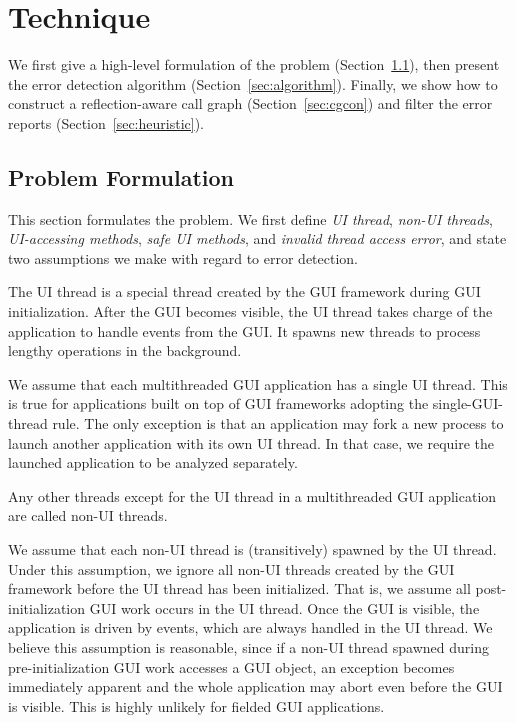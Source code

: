 \section{Technique}
\label{sec:technique}

We first give a high-level formulation of the problem (Section~\ref{sec:probl}), then present
the error detection algorithm (Section~\ref{sec:algorithm}). Finally, we show how to 
construct a reflection-aware call graph (Section~\ref{sec:cgcon}) and filter the error reports (Section~\ref{sec:heuristic}).


\subsection{Problem Formulation}
\label{sec:probl}

This section formulates the problem. We first define 
\textit{UI thread}, \textit{non-UI threads},
\textit{UI-accessing methods},
 \textit{safe UI methods}, and \textit{invalid thread access error}, and
state two assumptions we make with regard to error detection.

\vspace{1mm}
 {The UI thread
is a special thread created by the GUI framework during
GUI initialization. After the GUI becomes visible, the UI thread
takes charge of the application to handle events from the GUI\@.
It spawns new threads to process lengthy operations in the background. }
\vspace{1mm}

 {We assume that each multithreaded
GUI application has a single UI thread. This is true for applications
built on top of GUI frameworks adopting the single-GUI-thread rule. The
only exception is that 
 an application may fork a new process to launch another
application with its own UI thread. In that case, we require the
launched application to be analyzed separately.}\vspace{1mm}

 {Any other
threads except for the UI thread in a multithreaded GUI application
 are called non-UI threads.}\vspace{1mm}

 { We assume that each non-UI
thread is (transitively) spawned by the UI thread. Under this assumption,
we ignore all non-UI threads created by the GUI framework
before the UI thread has been initialized. That is, we assume all post-initialization
GUI work occurs in the UI thread. Once the GUI is visible, the
application is driven by events, which are always handled in the UI thread.
We believe this assumption is reasonable, since if a non-UI thread 
spawned during pre-initialization GUI work accesses a GUI object, an exception becomes
immediately apparent and the whole application may abort even before the
GUI is visible. This is highly unlikely for fielded GUI
applications.
}\vspace{1mm}

